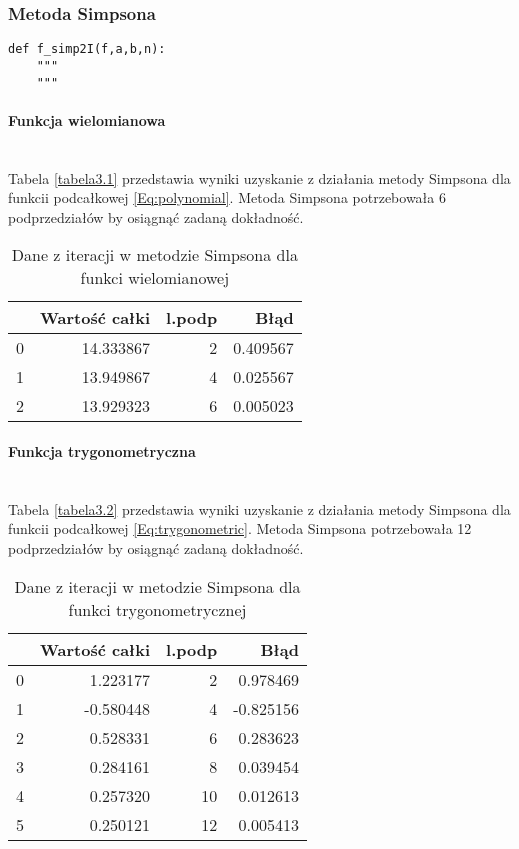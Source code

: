 \documentclass[12pt,twoside]{article}
\begin{document}
\subsubsection{Metoda Simpsona}

\begin{lstlisting}[caption={Kod w języku python implementujący metodę prostokątów}]
def f_simp2I(f,a,b,n):
    """
    """
\end{lstlisting}
\label{Listing 8}

\paragraph{Funkcja wielomianowa}\mbox{} \\

Tabela \eqref{tabela3.1} przedstawia wyniki uzyskanie z działania metody Simpsona dla funkcii podcałkowej \eqref{Eq:polynomial}. Metoda Simpsona potrzebowała 6 podprzedziałów by osiągnąć zadaną dokładność.

\begin{table}[H]
\centering 
\caption{Dane z iteracji w metodzie Simpsona dla funkci wielomianowej}
\label{tabela3.1}
\begin{tabular}{lrrr}
\toprule
{} &  Wartość całki &  l.podp &      Błąd \\
\midrule
0 &      14.333867 &       2 &  0.409567 \\
1 &      13.949867 &       4 &  0.025567 \\
2 &      13.929323 &       6 &  0.005023 \\
\bottomrule
\end{tabular}
\end{table}

\paragraph{Funkcja trygonometryczna}\mbox{} \\

Tabela \eqref{tabela3.2} przedstawia wyniki uzyskanie z działania metody Simpsona dla funkcii podcałkowej \eqref{Eq:trygonometric}. Metoda Simpsona potrzebowała 12 podprzedziałów by osiągnąć zadaną dokładność.

\begin{table}[H]
\centering
\caption{Dane z iteracji w metodzie Simpsona dla funkci trygonometrycznej}
\label{tabela3.2}
\begin{tabular}{lrrr}
\toprule
{} &  Wartość całki &  l.podp &      Błąd \\
\midrule
0 &       1.223177 &       2 &  0.978469 \\
1 &      -0.580448 &       4 & -0.825156 \\
2 &       0.528331 &       6 &  0.283623 \\
3 &       0.284161 &       8 &  0.039454 \\
4 &       0.257320 &      10 &  0.012613 \\
5 &       0.250121 &      12 &  0.005413 \\
\bottomrule
\end{tabular}
\end{table}
\end{document}
